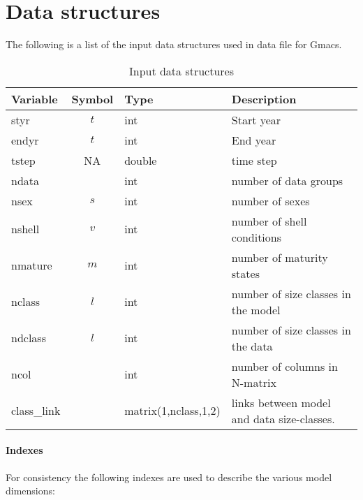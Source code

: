 \section{Data structures}
The following is a list of the input data structures used in data file for Gmacs.

\begin{table}[!tbh]
	\caption{Input data structures}\label{Tab:inputDataStructures}
	\begin{tabular}{lcll}
	\hline
	Variable & Symbol & Type & Description \\
	\hline
	styr & $t$      & int  & Start year  \\
	endyr & $t$     & int  & End year    \\
	tstep & NA    & double & time step \\
	ndata &  &  int        & number of data groups \\
	nsex  & $s$   & int    & number of sexes \\
	nshell & $v$  & int    & number of shell conditions\\
	nmature & $m$ & int    & number of maturity states \\
	nclass & $l$ & int & number of size classes in the model\\
	ndclass & $l$ & int & number of size classes in the data\\
	ncol & & int & number of columns in N-matrix \\


	class\_link & & matrix(1,nclass,1,2)&links between model and data size-classes.\\
	\hline         
	\end{tabular}
\end{table}


\paragraph{Indexes}
For consistency the following indexes are used to describe the various model dimensions:

